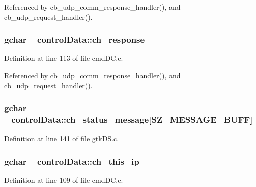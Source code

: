 Referenced by cb\+\_\+udp\+\_\+comm\+\_\+response\+\_\+handler(), and cb\+\_\+udp\+\_\+request\+\_\+handler().

\hypertarget{struct__control_data_a9423e8582b05e2dde58b7302bee5559b}{
\subsubsection[{ch\+\_\+response}]{\setlength{\rightskip}{0pt plus 5cm}gchar \+\_\+control\+Data\+::ch\+\_\+response}}\label{struct__control_data_a9423e8582b05e2dde58b7302bee5559b}


Definition at line 113 of file cmd\+D\+C.\+c.



Referenced by cb\+\_\+udp\+\_\+comm\+\_\+response\+\_\+handler(), and cb\+\_\+udp\+\_\+request\+\_\+handler().

\hypertarget{struct__control_data_aa6d5e703090d185edd3e0b5224542ce5}{
\subsubsection[{ch\+\_\+status\+\_\+message}]{\setlength{\rightskip}{0pt plus 5cm}gchar \+\_\+control\+Data\+::ch\+\_\+status\+\_\+message\mbox{[}{\bf S\+Z\+\_\+\+M\+E\+S\+S\+A\+G\+E\+\_\+\+B\+U\+F\+F}\mbox{]}}}\label{struct__control_data_aa6d5e703090d185edd3e0b5224542ce5}


Definition at line 141 of file gtk\+D\+S.\+c.

\hypertarget{struct__control_data_ac48fc4263dd4a6bad484b93fbf1ffe1b}{
\subsubsection[{ch\+\_\+this\+\_\+ip}]{\setlength{\rightskip}{0pt plus 5cm}gchar \+\_\+control\+Data\+::ch\+\_\+this\+\_\+ip}}\label{struct__control_data_ac48fc4263dd4a6bad484b93fbf1ffe1b}


Definition at line 109 of file cmd\+D\+C.\+c.



